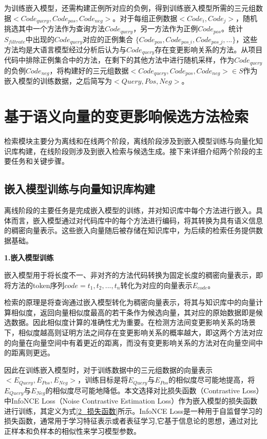 为训练嵌入模型，还需构建正例所对应的负例，得到训练嵌入模型所需的三元组数据$<Code_{query},Code_{pos},Code_{neg}>$。对于每组正例数据$<Code_i,Code_j>$，随机挑选其中一个方法作为查询方法$Code_{query}$，另一方法作为正例$Code_{pos}$。统计$S_{filtrate}$中出现的$Code_{query}$对应的正例集合 $\{Code_{pos},Code_{pos\_i},Code_{pos\_j},...\}$，这些方法均是大语言模型经过分析后认为与$Code_{query}$存在变更影响关系的方法。从项目代码中排除正例集合中的方法，在剩下的其他方法中进行随机采样，作为$Code_{query}$的负例$Code_{neg}$，将构建好的三元组数据$<Code_{query},Code_{pos},Code_{neg}>\in S$作为嵌入模型的训练数据，之后简写为$<Query,Pos,Neg>$。




\section{基于语义向量的变更影响候选方法检索}

检索模块主要分为离线和在线两个阶段，离线阶段涉及到嵌入模型训练与向量化知识库构建，在线阶段则涉及到嵌入检索与候选生成。接下来详细介绍两个阶段的主要任务和关键步骤。

\subsection{嵌入模型训练与向量知识库构建}


离线阶段的主要任务是完成嵌入模型的训练，并对知识库中每个方法进行嵌入。具体而言，嵌入模型通过对代码库中的每个方法进行编码，将其转换为具有语义信息的稠密向量表示。这些嵌入向量随后被存储在知识库中，为后续的检索任务提供数据基础。

\noindent \textbf{1.嵌入模型训练}

嵌入模型用于将长度不一、非对齐的方法代码转换为固定长度的稠密向量表示，即将方法的token序列$code = {t_1, t_2, ..., t_n}$转化为对应的向量表示$E_{code}$。

检索的原理是将查询通过嵌入模型转化为稠密向量表示，将其与知识库中的向量计算相似度，返回向量相似度最高的若干条作为候选向量，其对应的原始数据即是候选数据。因此相似度计算的准确性尤为重要。在检测方法间变更影响关系的场景下，相似度越高则证明方法之间存在变更影响关系的概率越大，即这两个方法对应的向量在向量空间中有着更近的距离，而没有变更影响关系的方法对在向量空间中的距离则更远。

因此在训练嵌入模型时，对于训练数据中的三元组数据的向量表示$<E_{Query},E_{Pos},E_{Neg}>$，训练目标是将$E_{Query}$与$E_{Pos}$的相似度尽可能地提高，将$E_{Query}$与$E_{Neg}$的相似度尽可能地降低。本文选择对比损失函数（Contrastive Loss）中InfoNCE Loss（Noise Contrastive Estimation Loss）作为嵌入模型的损失函数进行训练，其定义为式\ref{2_损失函数}所示。InfoNCE Loss是一种用于自监督学习的损失函数\cite{2019Momentum}，通常用于学习特征表示或者表征学习,它基于信息论的思想，通过对比正样本和负样本的相似性来学习模型参数。

